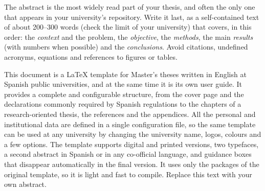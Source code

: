 \begin{abstractpage}

\begin{guidance}
The abstract is the most widely read part of your thesis, and often the only one that
appears in your university's repository. Write it last, as a self-contained text of
about 200--300 words (check the limit of your university) that covers, in this order:
the \emph{context} and the problem, the \emph{objective}, the \emph{methods}, the main
\emph{results} (with numbers when possible) and the \emph{conclusions}. Avoid
citations, undefined acronyms, equations and references to figures or tables.
\end{guidance}

This document is a \LaTeX{} template for Master's theses written in English at Spanish
public universities, and at the same time it is its own user guide. It provides a
complete and configurable structure, from the cover page and the declarations commonly
required by Spanish regulations to the chapters of a research-oriented thesis, the
references and the appendices. All the personal and institutional data are defined in a
single configuration file, so the same template can be used at any university by changing
the university name, logos, colours and a few options. The template supports digital and
printed versions, two typefaces, a second abstract in Spanish or in any co-official
language, and guidance boxes that disappear automatically in the final version. It uses
only the packages of the original template, so it is light and fast to compile. Replace this text with your own abstract.

\end{abstractpage}
